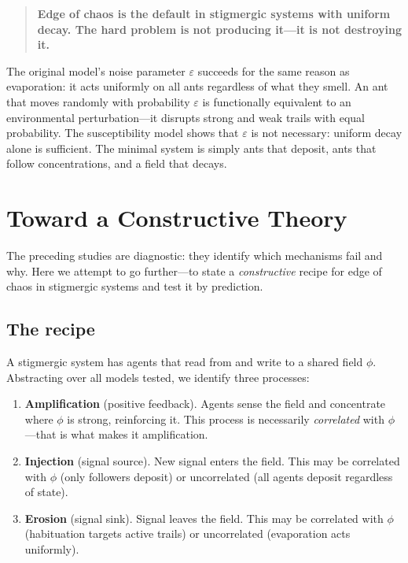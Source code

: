 \documentclass[11pt,a4paper]{article}
\begin{document}
\begin{quote}
\textbf{Edge of chaos is the default in stigmergic systems with uniform decay.
The hard problem is not producing it---it is not destroying it.}
\end{quote}

The original model's noise parameter $\varepsilon$ succeeds for the same reason as evaporation: it acts uniformly on all ants regardless of what they smell.
An ant that moves randomly with probability $\varepsilon$ is functionally equivalent to an environmental perturbation---it disrupts strong and weak trails with equal probability.
The susceptibility model shows that $\varepsilon$ is not necessary: uniform decay alone is sufficient.
The minimal system is simply ants that deposit, ants that follow concentrations, and a field that decays.

\appendix
\section{Toward a Constructive Theory}
\label{app:constructive}

The preceding studies are diagnostic: they identify which mechanisms fail and why.
Here we attempt to go further---to state a \emph{constructive} recipe for edge of chaos in stigmergic systems and test it by prediction.

\subsection{The recipe}

A stigmergic system has agents that read from and write to a shared field $\phi$.
Abstracting over all models tested, we identify three processes:

\begin{enumerate}
  \item \textbf{Amplification} (positive feedback).
    Agents sense the field and concentrate where $\phi$ is strong, reinforcing it.
    This process is necessarily \emph{correlated} with $\phi$---that is what makes it amplification.
  \item \textbf{Injection} (signal source).
    New signal enters the field.
    This may be correlated with $\phi$ (only followers deposit) or uncorrelated (all agents deposit regardless of state).
  \item \textbf{Erosion} (signal sink).
    Signal leaves the field.
    This may be correlated with $\phi$ (habituation targets active trails) or uncorrelated (evaporation acts uniformly).
\end{enumerate}
\end{document}
